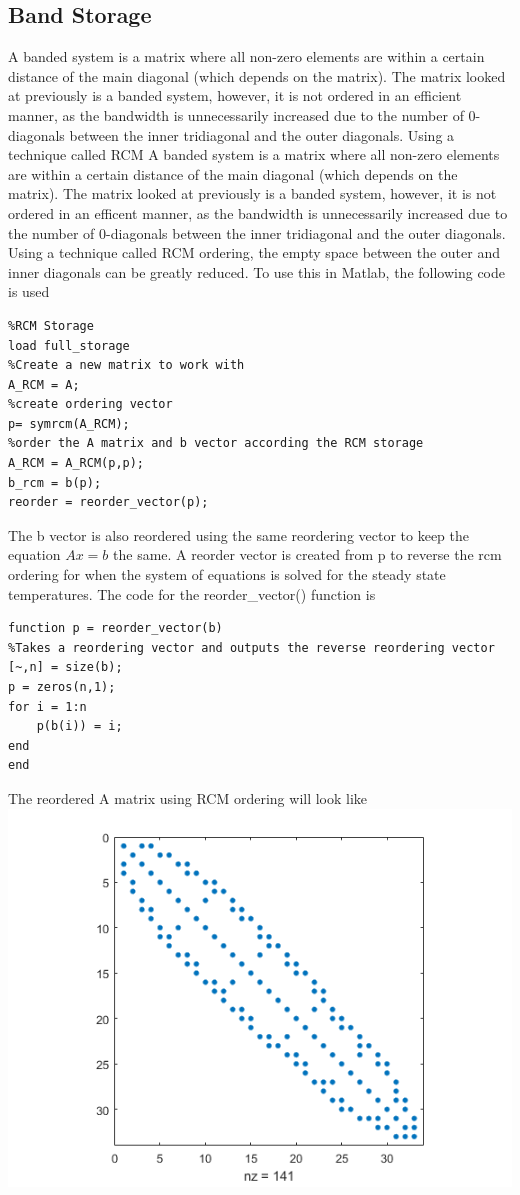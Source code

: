 \documentclass[12pt,a4paper]{article}
\begin{document}
\subsection{Band Storage}
A banded system is a matrix where all non-zero elements are within a certain distance of the main diagonal (which depends on the matrix). The matrix looked at previously is a banded system, however, it is not ordered in an efficient manner, as the bandwidth is unnecessarily increased due to the number of 0-diagonals between the inner tridiagonal and the outer diagonals. Using a technique called RCM 
A banded system is a matrix where all non-zero elements are within a certain distance of the main diagonal (which depends on the matrix). The matrix looked at previously is a banded system, however, it is not ordered in an efficent manner, as the bandwidth is unnecessarily increased due to the number of 0-diagonals between the inner tridiagonal and the outer diagonals. Using a technique called RCM ordering, the empty space between the outer and inner diagonals can be greatly reduced. To use this in Matlab, the following code is used
\begin{verbatim}
%RCM Storage
load full_storage
%Create a new matrix to work with
A_RCM = A;
%create ordering vector
p= symrcm(A_RCM);
%order the A matrix and b vector according the RCM storage
A_RCM = A_RCM(p,p);
b_rcm = b(p);
reorder = reorder_vector(p);
\end{verbatim}
The b vector is also reordered using the same reordering vector to keep the equation $Ax=b$ the same. A reorder vector is created from p to reverse the rcm ordering for when the system of equations is solved for the steady state temperatures. The code for the reorder\_vector() function is
\begin{verbatim}
function p = reorder_vector(b)
%Takes a reordering vector and outputs the reverse reordering vector
[~,n] = size(b);
p = zeros(n,1);
for i = 1:n
	p(b(i)) = i;
end
end
\end{verbatim}
The reordered A matrix using RCM ordering will look like\\
\includegraphics{images/ARCM.png}
\end{document}
